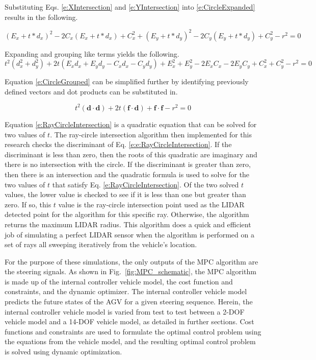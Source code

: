 \documentclass[12pt,onecolumn]{report}
\begin{document}
Substituting Eqs. \ref{e:XIntersection} and \ref{e:YIntersection} into \ref{e:CircleExpanded} results in the following.

\begin{equation}\label{e:CircleSubst}
\left(E_{x} + t*d_{x}\right)^2 - 2C_{x}\left(E_{x} + t*d_{x}\right) + C_{x}^{2} + \left(E_{y} + t*d_{y}\right)^2 - 2C_{y}\left(E_{y} + t*d_{y}\right)+ C_{y}^{2} - r^2 = 0
\end{equation}

Expanding and grouping like terms yields the following.
\begin{equation}\label{e:CircleGrouped}
t^{2}\left(d_{x}^{2} + d_{y}^{2}\right) + 2t\left(E_{x}d_{x} + E_{y}d_{y} - C_{x}d_{x} - C_{y}d_{y}\right) + E_{x}^{2} + E_{y}^{2} - 2 E_{x}C_{x} - 2 E_{y}C_{y} + C_{x}^{2} + C_{y}^{2} - r^{2} = 0
\end{equation}

Equation \ref{e:CircleGrouped} can be simplified further by identifying previously defined vectors and dot products can be substituted in.

\begin{equation}\label{e:RayCircleIntersection}
t^{2}\left(\boldsymbol{d}\cdot\boldsymbol{d}\right) + 2t\left(\boldsymbol{f}\cdot\boldsymbol{d}\right) +\boldsymbol{f}\cdot\boldsymbol{f} - r^{2} = 0
\end{equation}

Equation \ref{e:RayCircleIntersection} is a quadratic equation that can be solved for two values of $t$. The ray-circle intersection algorithm then implemented for this research checks the discriminant of Eq. \ref{e:e:RayCircleIntersection}. If the discriminant is less than zero, then the roots of this quadratic are imaginary and there is no intersection with the circle. If the discriminant is greater than zero, then there is an intersection and the quadratic formula is used to solve for the two values of $t$ that satisfy Eq. \ref{e:RayCircleIntersection}. Of the two solved $t$ values, the lower value is checked to see if it is less than one but greater than zero. If so, this $t$ value is the ray-circle intersection point used as the LIDAR detected point for the algorithm for this specific ray. Otherwise, the algorithm returns the maximum LIDAR radius. This algorithm does a quick and efficient job of simulating a perfect LIDAR sensor when the algorithm is performed on a set of rays all sweeping iteratively from the vehicle's location.

For the purpose of these simulations, the only outputs of the MPC algorithm are the steering signals. As shown in Fig.~\ref{fig:MPC_schematic}, the MPC algorithm is made up of the internal controller vehicle model, the cost function and constraints, and the dynamic optimizer. The internal controller vehicle model predicts the future states of the AGV for a given steering sequence. Herein, the internal controller vehicle model is varied from test to test between a 2-DOF vehicle model and a 14-DOF vehicle model, as detailed in further sections. Cost functions and constraints are used to formulate the optimal control problem using the equations from the vehicle model, and the resulting optimal control problem is solved using dynamic optimization.
\end{document}
